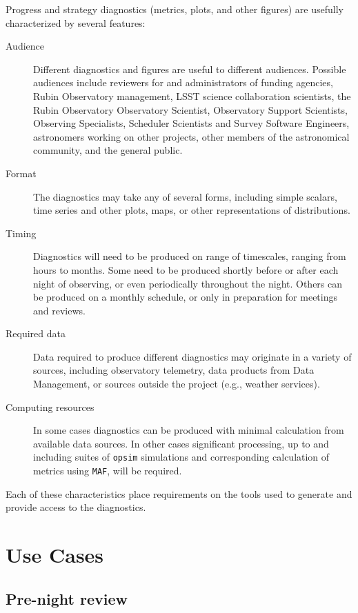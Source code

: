 Progress and strategy diagnostics (metrics, plots, and other figures) are usefully characterized by several features:
\begin{description}
\item[{Audience}] Different diagnostics and figures are useful to different audiences. Possible audiences include reviewers for and administrators of funding agencies, Rubin Observatory management, LSST science collaboration scientists, the Rubin Observatory Observatory Scientist, Observatory Support Scientists, Observing Specialists, Scheduler Scientists and Survey Software Engineers, astronomers working on other projects, other members of the astronomical community, and the general public.
\item[{Format}] The diagnostics may take any of several forms, including simple scalars, time series and other plots, maps, or other representations of distributions.
\item[{Timing}] Diagnostics will need to be produced on range of timescales, ranging from hours to months. Some need to be produced shortly before or after each night of observing, or even periodically throughout the night. Others can be produced on a monthly schedule, or only in preparation for meetings and reviews.
\item[{Required data}] Data required to produce different diagnostics may originate in a variety of sources, including observatory telemetry, data products from Data Management, or sources outside the project (e.g., weather services).
\item[{Computing resources}] In some cases diagnostics can be produced with minimal calculation from available data sources. In other cases significant processing, up to and including suites of \texttt{opsim} simulations and corresponding calculation of metrics using \texttt{MAF}, will be required.
\end{description}

Each of these characteristics place requirements on the tools used to generate and provide access to the diagnostics.

\section{Use Cases}
\label{sec:orgeaeaad3}
\subsection{Pre-night review}
\label{sec:orgbffb978}

